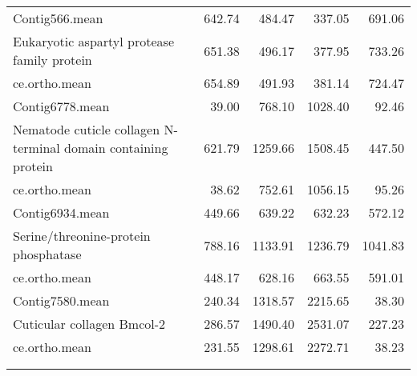 \begin{longtable}{p{7cm}rrrr}
Contig566.mean & 642.74 & 484.47 & 337.05 & 691.06 \\ 
  Eukaryotic aspartyl protease family protein & 651.38 & 496.17 & 377.95 & 733.26 \\ 
  ce.ortho.mean & 654.89 & 491.93 & 381.14 & 724.47 \\ 
   \hline
Contig6778.mean & 39.00 & 768.10 & 1028.40 & 92.46 \\ 
  Nematode cuticle collagen N-terminal domain containing protein & 621.79 & 1259.66 & 1508.45 & 447.50 \\ 
  ce.ortho.mean & 38.62 & 752.61 & 1056.15 & 95.26 \\ 
   \hline
Contig6934.mean & 449.66 & 639.22 & 632.23 & 572.12 \\ 
  Serine/threonine-protein phosphatase & 788.16 & 1133.91 & 1236.79 & 1041.83 \\ 
  ce.ortho.mean & 448.17 & 628.16 & 663.55 & 591.01 \\ 
   \hline
Contig7580.mean & 240.34 & 1318.57 & 2215.65 & 38.30 \\ 
  Cuticular collagen Bmcol-2 & 286.57 & 1490.40 & 2531.07 & 227.23 \\ 
  ce.ortho.mean & 231.55 & 1298.61 & 2272.71 & 38.23 \\ 
  \hline\\
\label{eel.sing.diff}
\end{longtable}

